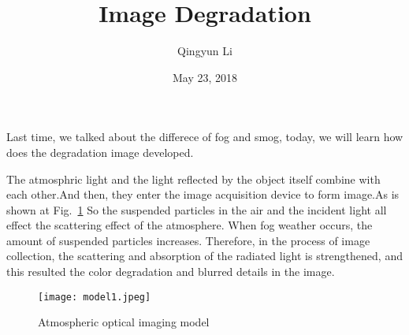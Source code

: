 \documentclass{article}
\author{Qingyun Li}
\date{May 23, 2018}
\title{Image Degradation}
\begin{document}
\maketitle
 \par Last time, we talked about the differece of fog and smog, today, we will learn how does the degradation image developed. 
 \par The atmosphric light and the light reflected by the object itself combine with each other.And then, they enter the image acquisition device to form image.As is shown at Fig.~\ref{model1} So the suspended particles in the air and the incident light all effect the scattering effect of the atmosphere. When fog weather occurs, the amount of suspended particles increases. Therefore, in the process of image collection, the scattering and absorption of the radiated light is strengthened, and this resulted the color degradation and blurred details in the image.
 \begin{figure}[htbp]
\begin{minipage}{1\linewidth}
\centering{}
\texttt{[image: model1.jpeg]}\\
\caption{Atmospheric optical imaging model}\label{model1}
\end{minipage}
\end{figure}


\end{document}
